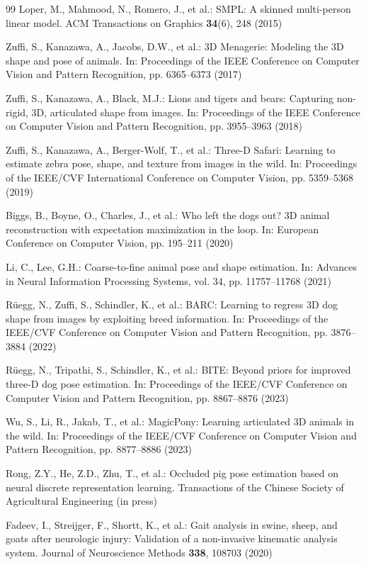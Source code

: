 \documentclass[runningheads]{llncs}
\begin{document}
\begin{thebibliography}{99}
Loper, M., Mahmood, N., Romero, J., et al.: SMPL: A skinned multi-person linear model. ACM Transactions on Graphics \textbf{34}(6), 248 (2015)

Zuffi, S., Kanazawa, A., Jacobs, D.W., et al.: 3D Menagerie: Modeling the 3D shape and pose of animals. In: Proceedings of the IEEE Conference on Computer Vision and Pattern Recognition, pp. 6365--6373 (2017)

Zuffi, S., Kanazawa, A., Black, M.J.: Lions and tigers and bears: Capturing non-rigid, 3D, articulated shape from images. In: Proceedings of the IEEE Conference on Computer Vision and Pattern Recognition, pp. 3955--3963 (2018)

Zuffi, S., Kanazawa, A., Berger-Wolf, T., et al.: Three-D Safari: Learning to estimate zebra pose, shape, and texture from images in the wild. In: Proceedings of the IEEE/CVF International Conference on Computer Vision, pp. 5359--5368 (2019)

Biggs, B., Boyne, O., Charles, J., et al.: Who left the dogs out? 3D animal reconstruction with expectation maximization in the loop. In: European Conference on Computer Vision, pp. 195--211 (2020)

Li, C., Lee, G.H.: Coarse-to-fine animal pose and shape estimation. In: Advances in Neural Information Processing Systems, vol. 34, pp. 11757--11768 (2021)

Rüegg, N., Zuffi, S., Schindler, K., et al.: BARC: Learning to regress 3D dog shape from images by exploiting breed information. In: Proceedings of the IEEE/CVF Conference on Computer Vision and Pattern Recognition, pp. 3876--3884 (2022)

Rüegg, N., Tripathi, S., Schindler, K., et al.: BITE: Beyond priors for improved three-D dog pose estimation. In: Proceedings of the IEEE/CVF Conference on Computer Vision and Pattern Recognition, pp. 8867--8876 (2023)

Wu, S., Li, R., Jakab, T., et al.: MagicPony: Learning articulated 3D animals in the wild. In: Proceedings of the IEEE/CVF Conference on Computer Vision and Pattern Recognition, pp. 8877--8886 (2023)

Rong, Z.Y., He, Z.D., Zhu, T., et al.: Occluded pig pose estimation based on neural discrete representation learning. Transactions of the Chinese Society of Agricultural Engineering (in press)

Fadeev, I., Streijger, F., Shortt, K., et al.: Gait analysis in swine, sheep, and goats after neurologic injury: Validation of a non-invasive kinematic analysis system. Journal of Neuroscience Methods \textbf{338}, 108703 (2020)


\end{thebibliography}
\end{document}
